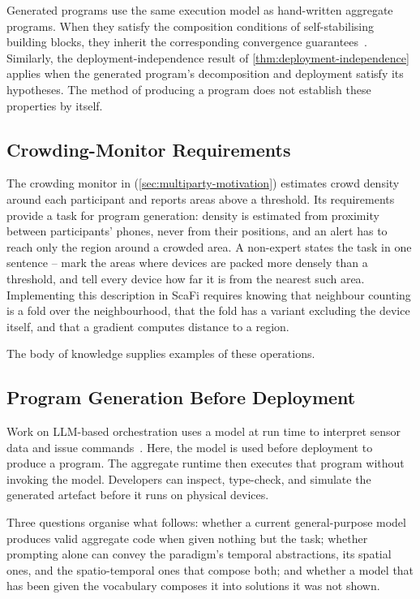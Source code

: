 Generated programs use the same execution model as hand-written aggregate programs.
When they satisfy the composition conditions of self-stabilising building blocks, they inherit the corresponding convergence guarantees~\cite{DBLP:journals/tomacs/ViroliABDP18}.
Similarly, the deployment-independence result of \cref{thm:deployment-independence} applies when the generated program's decomposition and deployment satisfy its hypotheses.
The method of producing a program does not establish these properties by itself.

\subsection{Crowding-Monitor Requirements}
\label{subsec:llm-crowding-task}

The crowding monitor in \cityevt (\cref{sec:multiparty-motivation}) estimates crowd density around each participant and reports areas above a threshold.
Its requirements provide a task for program generation:
density is estimated from proximity between participants' phones,
never from their positions,
and an alert has to reach only the region around a crowded area.
%
A non-expert states the task in one sentence --
mark the areas where devices are packed more densely than a threshold, and tell every device how far it is from the nearest such area.
%
Implementing this description in ScaFi requires knowing that neighbour counting is a fold over the neighbourhood,
that the fold has a variant excluding the device itself,
and that a gradient computes distance to a region.

The body of knowledge supplies examples of these operations.

\subsection{Program Generation Before Deployment}
\label{subsec:llm-positioning}

Work on LLM-based orchestration uses a model at run time to interpret sensor data and issue commands~\cite{DBLP:journals/diot/ZongHGLK25}.
Here, the model is used before deployment to produce a program.
The aggregate runtime then executes that program without invoking the model.
Developers can inspect, type-check, and simulate the generated artefact before it runs on physical devices.

Three questions organise what follows:
whether a current general-purpose model produces valid aggregate code when given nothing but the task;
whether prompting alone can convey the paradigm's temporal abstractions,
its spatial ones,
and the spatio-temporal ones that compose both;
and whether a model that has been given the vocabulary composes it into solutions it was not shown.

